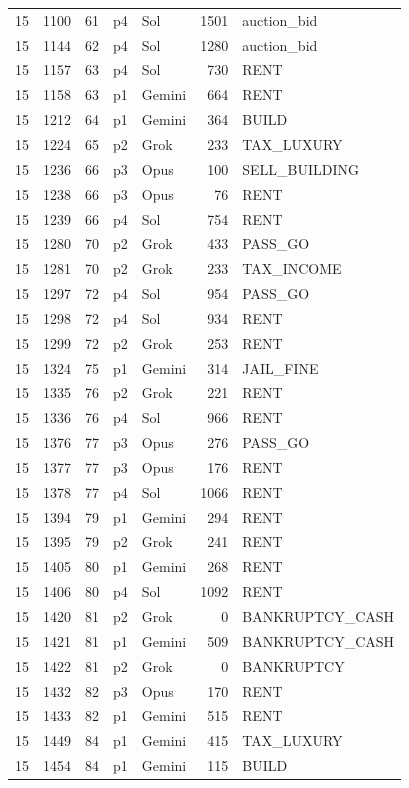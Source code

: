 \begin{longtable}{r r r l l r L{2.2in}}
15 & 1100 & 61 & p4 & Sol & 1501 & auction\_bid \\
15 & 1144 & 62 & p4 & Sol & 1280 & auction\_bid \\
15 & 1157 & 63 & p4 & Sol & 730 & RENT \\
15 & 1158 & 63 & p1 & Gemini & 664 & RENT \\
15 & 1212 & 64 & p1 & Gemini & 364 & BUILD \\
15 & 1224 & 65 & p2 & Grok & 233 & TAX\_LUXURY \\
15 & 1236 & 66 & p3 & Opus & 100 & SELL\_BUILDING \\
15 & 1238 & 66 & p3 & Opus & 76 & RENT \\
15 & 1239 & 66 & p4 & Sol & 754 & RENT \\
15 & 1280 & 70 & p2 & Grok & 433 & PASS\_GO \\
15 & 1281 & 70 & p2 & Grok & 233 & TAX\_INCOME \\
15 & 1297 & 72 & p4 & Sol & 954 & PASS\_GO \\
15 & 1298 & 72 & p4 & Sol & 934 & RENT \\
15 & 1299 & 72 & p2 & Grok & 253 & RENT \\
15 & 1324 & 75 & p1 & Gemini & 314 & JAIL\_FINE \\
15 & 1335 & 76 & p2 & Grok & 221 & RENT \\
15 & 1336 & 76 & p4 & Sol & 966 & RENT \\
15 & 1376 & 77 & p3 & Opus & 276 & PASS\_GO \\
15 & 1377 & 77 & p3 & Opus & 176 & RENT \\
15 & 1378 & 77 & p4 & Sol & 1066 & RENT \\
15 & 1394 & 79 & p1 & Gemini & 294 & RENT \\
15 & 1395 & 79 & p2 & Grok & 241 & RENT \\
15 & 1405 & 80 & p1 & Gemini & 268 & RENT \\
15 & 1406 & 80 & p4 & Sol & 1092 & RENT \\
15 & 1420 & 81 & p2 & Grok & 0 & BANKRUPTCY\_CASH \\
15 & 1421 & 81 & p1 & Gemini & 509 & BANKRUPTCY\_CASH \\
15 & 1422 & 81 & p2 & Grok & 0 & BANKRUPTCY \\
15 & 1432 & 82 & p3 & Opus & 170 & RENT \\
15 & 1433 & 82 & p1 & Gemini & 515 & RENT \\
15 & 1449 & 84 & p1 & Gemini & 415 & TAX\_LUXURY \\
15 & 1454 & 84 & p1 & Gemini & 115 & BUILD \\

\end{longtable}

